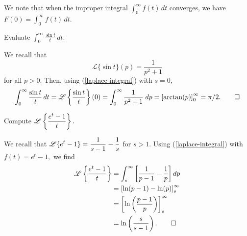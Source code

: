 We note that when the improper integral $\int_0^\infty f(t)\, dt$ converges, we have $F(0) =\int_0^\infty f(t)\, dt.$  
\begin{example}
Evaluate $\displaystyle \int_0^\infty \frac{\sin t}{t}\, dt.$

\begin{solution} We recall that \[\mathscr{L}\{\sin t\}(p) = \frac{1}{p^2+1}\] for all $p>0.$
Then, using (\ref{laplace-integral}) with $s=0,$
	\[\int_0^\infty \frac{\sin t}{t}\, dt =\mathscr{L}\left\{\frac{\sin t}{t}\right\}(0)= \int_0^\infty \frac{1}{p^2+1}\;dp = \left[\arctan(p)\right]_0^\infty = \pi/2.\qedhere\]
	\end{solution}
\end{example}

\begin{example}
	Compute $\displaystyle\mathscr{L}\left\{\frac{e^{t}-1}{t}\right\}.$
	
	\begin{solution} We recall that $\displaystyle \mathscr{L}\{e^{t}-1\} = \frac{1}{s-1}- \frac{1}{s}$ for $s>1$.
		 Using (\ref{laplace-integral}) with $f(t) = e^t-1,$ we find 
		\[\begin{split}
		\mathscr{L}\left\{\frac{e^{t}-1}{t}\right\} &= \int_s^\infty \left[\frac{1}{p-1}- \frac{1}{p}\right]dp\\
		&= \left[\ln(p-1) - \ln(p)\right]_s^\infty\\
		& = \left[\ln\left(\frac{p-1}{p}\right)\right]_s^\infty\\
		&=\ln\left(\frac{s }{s-1}\right).\qedhere
		\end{split} \]
	\end{solution}
\end{example}





